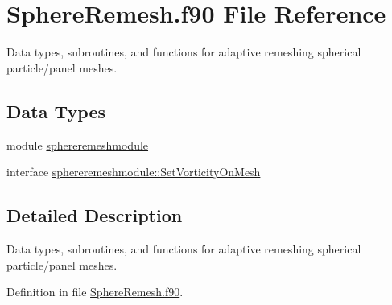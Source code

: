 \hypertarget{SphereRemesh_8f90}{\section{Sphere\+Remesh.\+f90 File Reference}
\label{SphereRemesh_8f90}
}


Data types, subroutines, and functions for adaptive remeshing spherical particle/panel meshes.  


\subsection*{Data Types}
\begin{DoxyCompactItemize}
\item 
module \hyperlink{classsphereremeshmodule}{sphereremeshmodule}
\item 
interface \hyperlink{interfacesphereremeshmodule_1_1SetVorticityOnMesh}{sphereremeshmodule\+::\+Set\+Vorticity\+On\+Mesh}
\end{DoxyCompactItemize}


\subsection{Detailed Description}
Data types, subroutines, and functions for adaptive remeshing spherical particle/panel meshes. 



Definition in file \hyperlink{SphereRemesh_8f90_source}{Sphere\+Remesh.\+f90}.


